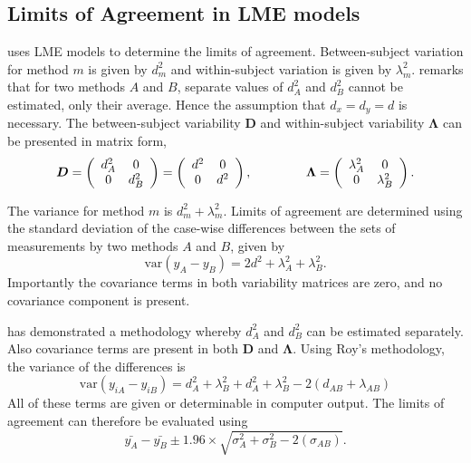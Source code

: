 \documentclass[12pt, a4paper]{report}
\theoremstyle{plain}
\theoremstyle{definition}
\theoremstyle{remark}
\begin{document}
\subsection{Limits of Agreement in LME models}
\citet{BXC2008} uses LME models to determine the limits of agreement. Between-subject variation for method $m$ is given by $d^2_{m}$ and within-subject variation is given by $\lambda^2_{m}$.  \citet{BXC2008} remarks that for two methods $A$ and $B$, separate values of $d^2_{A}$ and $d^2_{B}$ cannot be estimated, only their average. Hence the assumption that $d_{x}= d_{y}= d$ is necessary. The between-subject variability $\boldsymbol{D}$ and within-subject variability $\boldsymbol{\Lambda}$ can be presented in matrix form,\[
\boldsymbol{D} = \left(%
\begin{array}{cc}
d^2_{A}& 0 \\
0 & d^2_{B} \\
\end{array}%
\right)=\left(%
\begin{array}{cc}
d^2& 0 \\
0 & d^2\\
\end{array}%
\right),
\hspace{1.5cm}
\boldsymbol{\Lambda} = \left(%
\begin{array}{cc}
\lambda^2_{A}& 0 \\
0 & \lambda^2_{B} \\
\end{array}%
\right).
\]

The variance for method $m$ is $d^2_{m}+\lambda^2_{m}$. Limits of agreement are determined using the standard deviation of the case-wise differences between the sets of measurements by two methods $A$ and $B$, given by
\begin{equation}
\mbox{var} (y_{A}-y_{B}) = 2d^2 + \lambda^2_{A}+ \lambda^2_{B}.
\end{equation}
Importantly the covariance terms in both variability matrices are zero, and no covariance component is present.


\citet{ARoy2009} has demonstrated a methodology whereby $d^2_{A}$ and $d^2_{B}$ can be estimated separately. Also covariance terms are present in both $\boldsymbol{D}$ and $\boldsymbol{\Lambda}$. Using Roy's methodology, the variance of the differences is
\begin{equation}
\mbox{var} (y_{iA}-y_{iB})= d^2_{A} + \lambda^2_{B} + d^2_{A} + \lambda^2_{B} - 2(d_{AB} + \lambda_{AB})
\end{equation}
All of these terms are given or determinable in computer output.
The limits of agreement can therefore be evaluated using
\begin{equation}
\bar{y_{A}}-\bar{y_{B}} \pm 1.96 \times \sqrt{ \sigma^2_{A} + \sigma^2_{B}  - 2(\sigma_{AB})}.
\end{equation}
\end{document}
